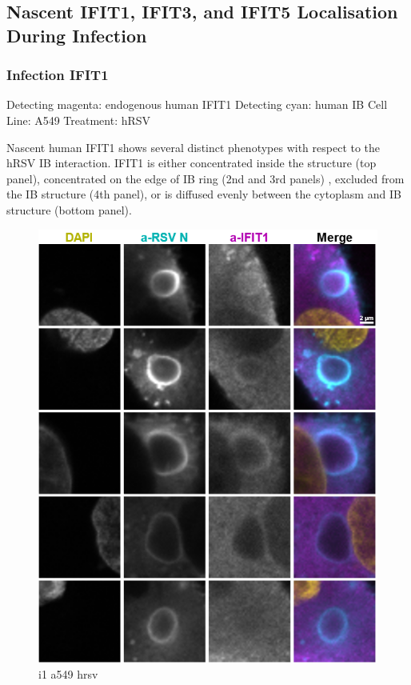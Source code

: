 \subsection{Nascent IFIT1, IFIT3, and IFIT5 Localisation During Infection} \label{subsec:Nascent IFIT1, IFIT3, and IFIT5 Localisation During Infection}
\subsubsection{Infection IFIT1}
Detecting magenta: endogenous human IFIT1 \newline
Detecting cyan: human IB \newline
Cell Line: A549 \newline
Treatment: hRSV \newline

Nascent human IFIT1 shows several distinct phenotypes with respect to the hRSV IB interaction. IFIT1 is either concentrated inside the structure (top panel), concentrated on the edge of IB ring (2nd and 3rd panels)  , excluded from the IB structure (4th panel),  or is diffused evenly between the cytoplasm and IB structure (bottom panel).

\begin{figure}
    \centering
    \includegraphics[width=1\linewidth]{09. Chapter 4/Figs/02. Infection/01. a549 i1.png}
    \caption[i1 a549 hrsv]{i1 a549 hrsv}
    \label{fig:i1 a549 hrsv}
\end{figure}



